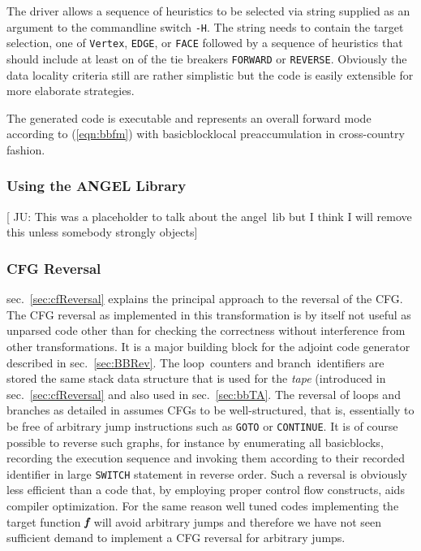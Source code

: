 \documentclass{book}
\newcommand{\angel}{angel}
\newcommand{\Loop}{loop}
\newcommand{\branch}{branch}
\newcommand{\basicblock}{basicblock}
\newcommand{\bmf}{\mbox{\bf\em f}}
\newcommand{\refsec}[1]{{sec.~\ref{#1}}}
\newcommand{\refeqn}[1]{{(\ref{#1})}}
\begin{document}
The driver allows a sequence of heuristics to be selected via string supplied as 
an argument to the commandline switch \lstinline{-H}. The string needs to contain 
the target selection, one of \lstinline{Vertex}, \lstinline{EDGE}, or \lstinline{FACE} followed by 
a sequence of heuristics that should include at least on of the tie breakers \lstinline{FORWARD} or 
\lstinline{REVERSE}. 
Obviously the data locality criteria still are rather simplistic but 
the code is easily extensible for more elaborate strategies. 

The generated code is executable and represents an overall forward mode 
according to \refeqn{eqn:bbfm} with \basicblock\-local preaccumulation in 
cross-country fashion. 

\subsubsection{Using the ANGEL Library}\label{sec:angel}
{\color{red} [ JU: This was a placeholder to talk about the \angel\ lib 
  but I think I will remove this unless somebody strongly objects]}
\subsubsection{CFG Reversal}\label{sec:cfgRevAlg}

\refsec{sec:cfReversal} explains the principal approach to the reversal 
of the CFG. The CFG reversal as implemented in this transformation is 
by itself not useful as unparsed code other than for checking the correctness without 
interference from other transformations. It is a major building block for 
the  
adjoint code generator described in \refsec{sec:BBRev}. 
The \Loop\ counters and \branch\ identifiers are stored the same 
stack data structure that is used for the {\em tape} (introduced in 
\refsec{sec:cfReversal} and also used in \refsec{sec:bbTA}.  
The reversal of loops and branches as detailed in \cite{Utke2006ERo} assumes 
CFGs to be well-structured, that is, essentially to be free of arbitrary jump instructions 
such as \lstinline{GOTO} or \lstinline{CONTINUE}. 
It is of course possible to reverse such graphs, for instance by enumerating
all {\basicblock}s, recording the execution sequence and invoking them according 
to their recorded identifier in  large  \lstinline {SWITCH} statement in reverse order.
Such a reversal is obviously less efficient than a code that, by employing proper 
control flow constructs, aids compiler optimization. 
For the same reason well tuned codes implementing the target function $\bmf$ will 
avoid arbitrary jumps and therefore we have not seen sufficient demand to implement 
a CFG reversal for arbitrary jumps. 
\end{document}
